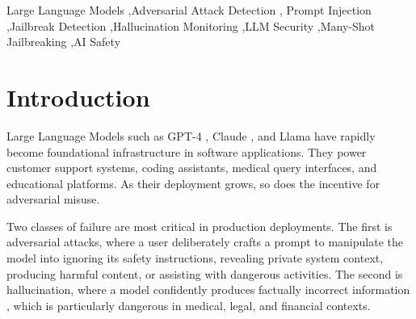 \documentclass[preprint,12pt,authoryear]{elsarticle}
\begin{document}
\begin{frontmatter}
\begin{abstract}
FIE is evaluated against two publicly available adversarial benchmarks.
On JailbreakBench \citep{chao2024jailbreakbench}, FIE achieves 98.6\%
recall and 97.9\% F1, outperforming Meta's Llama Prompt Guard 2-86M
\citep{metallamaguard2024} by 33.7 percentage points in recall while
operating fully offline. On HarmBench \citep{mazeika2024harmbench},
FIE achieves 70.6\% recall across seven semantic harm categories with
93.4\% precision. The system is deployed as a production REST API on
Google Cloud Run, published as a Python SDK on PyPI, and includes a
fully automated CI/CD pipeline with security hardening. All source
code, benchmark evaluation scripts, and trained model artifacts are
publicly available under the Apache-2.0 license.
\end{abstract}

\begin{keyword}
Large Language Models \sep Adversarial Attack Detection \sep
Prompt Injection \sep Jailbreak Detection \sep Hallucination Monitoring
\sep LLM Security \sep Many-Shot Jailbreaking \sep AI Safety
\end{keyword}

\end{frontmatter}

\linenumbers

\section{Introduction}
\label{sec:intro}

Large Language Models such as GPT-4 \citep{openai2023gpt4}, Claude
\citep{anthropic2024claude}, and Llama \citep{touvron2023llama} have
rapidly become foundational infrastructure in software applications.
They power customer support systems, coding assistants, medical query
interfaces, and educational platforms. As their deployment grows, so
does the incentive for adversarial misuse.

Two classes of failure are most critical in production deployments.
The first is adversarial attacks, where a user deliberately crafts a
prompt to manipulate the model into ignoring its safety instructions,
revealing private system context, producing harmful content, or
assisting with dangerous activities. The second is hallucination, where
a model confidently produces factually incorrect information
\citep{ji2023survey}, which is particularly dangerous in medical,
legal, and financial contexts.
\end{document}
